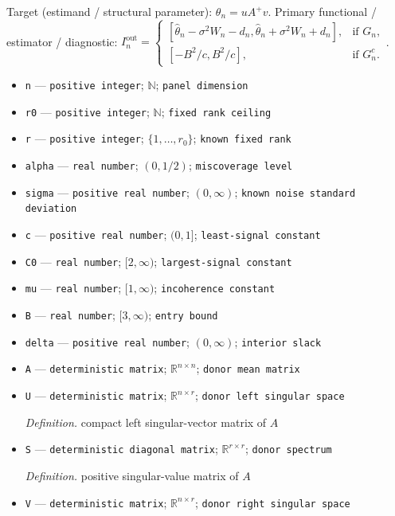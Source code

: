 \documentclass{article}
\begin{document}
Target (estimand / structural parameter): \(\theta_n=uA^+v\).
Primary functional / estimator / diagnostic: \(I_n^{\mathrm{out}}=\begin{cases}[\widehat\theta_n-\sigma^2W_n-d_n,\widehat\theta_n+\sigma^2W_n+d_n],&\text{if }G_n,\\{}[-B^2/c,B^2/c],&\text{if }G_n^c.\end{cases}\).
\begin{itemize}
  \item \texttt{n} --- \texttt{positive integer}; \(\mathbb N\); \texttt{panel dimension}
  \item \texttt{r0} --- \texttt{positive integer}; \(\mathbb N\); \texttt{fixed rank ceiling}
  \item \texttt{r} --- \texttt{positive integer}; \(\{1,\ldots,r_0\}\); \texttt{known fixed rank}
  \item \texttt{alpha} --- \texttt{real number}; \((0,1/2)\); \texttt{miscoverage level}
  \item \texttt{sigma} --- \texttt{positive real number}; \((0,\infty)\); \texttt{known noise standard deviation}
  \item \texttt{c} --- \texttt{positive real number}; \((0,1]\); \texttt{least-\allowbreak{}signal constant}
  \item \texttt{C0} --- \texttt{real number}; \([2,\infty)\); \texttt{largest-\allowbreak{}signal constant}
  \item \texttt{mu} --- \texttt{real number}; \([1,\infty)\); \texttt{incoherence constant}
  \item \texttt{B} --- \texttt{real number}; \([3,\infty)\); \texttt{entry bound}
  \item \texttt{delta} --- \texttt{positive real number}; \((0,\infty)\); \texttt{interior slack}
  \item \texttt{A} --- \texttt{deterministic matrix}; \(\mathbb R^{n\times n}\); \texttt{donor mean matrix}
  \item \texttt{U} --- \texttt{deterministic matrix}; \(\mathbb R^{n\times r}\); \texttt{donor left singular space}
  \par\smallskip\noindent\emph{Definition.} compact left singular-vector matrix of \(A\)
  \item \texttt{S} --- \texttt{deterministic diagonal matrix}; \(\mathbb R^{r\times r}\); \texttt{donor spectrum}
  \par\smallskip\noindent\emph{Definition.} positive singular-value matrix of \(A\)
  \item \texttt{V} --- \texttt{deterministic matrix}; \(\mathbb R^{n\times r}\); \texttt{donor right singular space}

\end{itemize}
\end{document}
